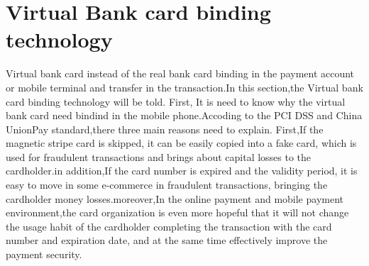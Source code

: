 \documentclass[journal]{IEEEtran}
\begin{document}
%


\section{Virtual Bank card binding technology}
Virtual bank card instead of the real bank card binding in the payment account or mobile terminal and transfer in the transaction.In this section,the Virtual bank card binding technology will be told. First, It is need to know why the virtual bank card need bindind in the mobile phone.Accoding to the PCI DSS and China UnionPay standard,there three main reasons need to explain.
First,If the magnetic stripe card is skipped, it can be easily copied into a fake card, which is used for fraudulent transactions and brings about capital losses to the cardholder.in addition,If the card number is expired and the validity period, it is easy to move in some e-commerce in fraudulent transactions, bringing the cardholder money losses.moreover,In the online payment and mobile payment environment,the card organization is even more hopeful that it will not change the usage habit of the cardholder completing the transaction with the card number and expiration date, and at the same time effectively improve the payment security.
\end{document}
